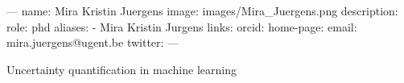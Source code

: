 ---
name: Mira Kristin Juergens
image: images/Mira_Juergens.png
description:
role: phd
aliases:
  - Mira Kristin Jurgens
links:
  orcid: 
  home-page: 
  email: mira.juergens@ugent.be
  twitter: 
---


Uncertainty quantification in machine learning